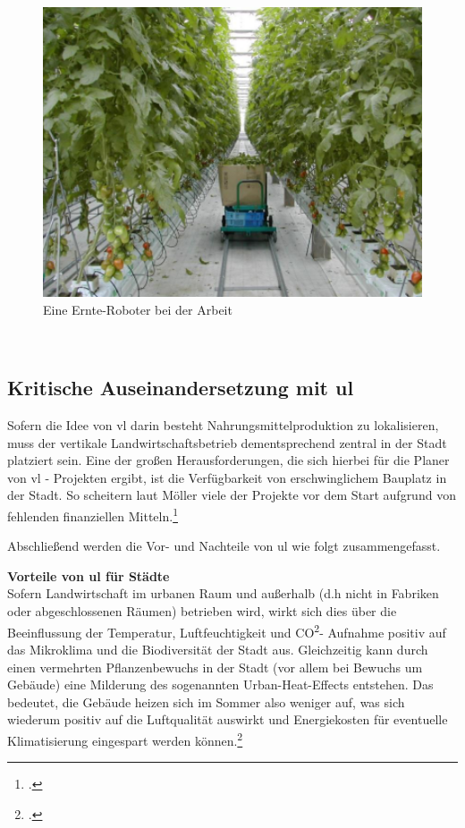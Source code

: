 \documentclass{scrartcl}
\begin{document}
\begin{figure}[htbp]
\centering
\includegraphics[width=14cm]{image_folder/automatisation_kondo.png}
\caption{Eine Ernte-Roboter bei der Arbeit}
\label{fig:Automatisierung}
\end{figure}
\\

\subsection{Kritische Auseinandersetzung mit \acs{ul} }


Sofern die Idee von \acs{vl} darin besteht Nahrungsmittelproduktion zu lokalisieren, muss der vertikale Landwirtschaftsbetrieb dementsprechend zentral in der Stadt platziert sein. Eine der großen Herausforderungen, die sich hierbei für die Planer von \acs{vl} - Projekten ergibt, ist die Verfügbarkeit von erschwinglichem Bauplatz in der Stadt. So scheitern laut Möller viele der Projekte vor dem Start aufgrund von fehlenden finanziellen Mitteln.\footcite[S.8]{PeterMollerVoss2013VerticalRise} 

Abschließend werden die Vor- und Nachteile von \acs{ul} wie folgt zusammengefasst.

\textbf{Vorteile von \acs{ul} für Städte} \\
Sofern Landwirtschaft im urbanen Raum und außerhalb (d.h nicht in Fabriken oder abgeschlossenen Räumen) betrieben wird, wirkt sich dies über die Beeinflussung der Temperatur, Luftfeuchtigkeit und CO\textsuperscript{2}- Aufnahme positiv auf das Mikroklima und die Biodiversität der Stadt aus.
Gleichzeitig kann durch einen vermehrten Pflanzenbewuchs in der Stadt (vor allem bei Bewuchs um Gebäude) eine Milderung des sogenannten Urban-Heat-Effects entstehen. Das bedeutet, die Gebäude heizen sich im Sommer also weniger auf, was sich wiederum positiv auf die Luftqualität auswirkt und Energiekosten für eventuelle Klimatisierung eingespart werden können.\footcites{Schulz2013UrbaneLandmanagements}[Vgl.][S.16]{Spring2012DerBasel-Stadt}
\end{document}
